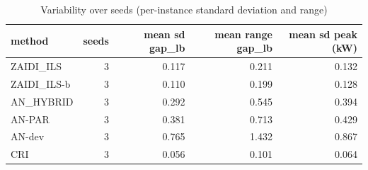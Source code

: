 \begin{table}[htbp]
\centering
\small
\caption{Variability over seeds (per-instance standard deviation and range)}
\label{tab:E10a_state_of_the_art_b10_seeds}
\begin{tabular}{lrrrr}
\toprule
method & seeds & mean sd gap\_lb & mean range gap\_lb & mean sd peak (kW) \\
\midrule
ZAIDI\_ILS & 3 & 0.117 & 0.211 & 0.132 \\
ZAIDI\_ILS-b & 3 & 0.110 & 0.199 & 0.128 \\
AN\_HYBRID & 3 & 0.292 & 0.545 & 0.394 \\
AN-PAR & 3 & 0.381 & 0.713 & 0.429 \\
AN-dev & 3 & 0.765 & 1.432 & 0.867 \\
CRI & 3 & 0.056 & 0.101 & 0.064 \\
\bottomrule
\end{tabular}
\end{table}
